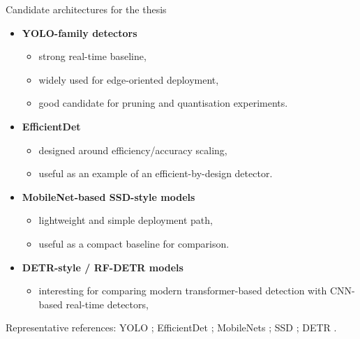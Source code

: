 \documentclass[aspectratio=169,11pt]{beamer}
\begin{document}
\begin{frame}{Candidate architectures for the thesis}
\begin{itemize}
  \item \textbf{YOLO-family detectors}
  \begin{itemize}
    \item strong real-time baseline,
    \item widely used for edge-oriented deployment,
    \item good candidate for pruning and quantisation experiments.
  \end{itemize}
  \item \textbf{EfficientDet}
  \begin{itemize}
    \item designed around efficiency/accuracy scaling,
    \item useful as an example of an efficient-by-design detector.
  \end{itemize}
  \item \textbf{MobileNet-based SSD-style models}
  \begin{itemize}
    \item lightweight and simple deployment path,
    \item useful as a compact baseline for comparison.
  \end{itemize}
  \item \textbf{DETR-style / RF-DETR models}
  \begin{itemize}
    \item interesting for comparing modern transformer-based detection with CNN-based real-time detectors,
  \end{itemize}
\end{itemize}

\vspace{1mm}
\footnotesize Representative references: YOLO \cite{Redmon2016YOLO}; EfficientDet \cite{Tan2020EfficientDet}; MobileNets \cite{Howard2017MobileNets}; SSD \cite{Liu2016SSD}; DETR \cite{Carion2020DETR}.

\end{frame}
\end{document}

